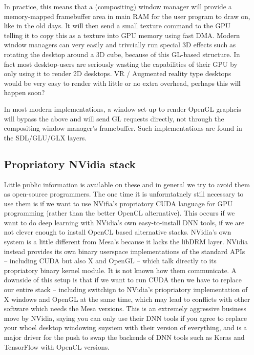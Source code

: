 \documentclass[oneside,english]{scrbook}
\begin{document}
In practice, this means that a (compositing) window manager will provide a memory-mapped framebuffer area in main RAM for the user program to draw on, like in the old days.   It will then send a small texture command to the GPU telling it to copy this as a texture into GPU memory using fast DMA.  Modern window managers can very easily and trivcially run special 3D effects such as rotating the desktop around a 3D cube, because of this GL-based structure.  In fact most desktop-users are seriously wasting the capabilities of their GPU by only using it to render 2D desktops. VR / Augmented reality type desktops would be very easy to render with little or no extra overhead, perhaps this will happen soon?

In most modern implementations, a window set up to render OpenGL graphcis will bypass the above and will send GL requests directly, not through the compositing window manager's framebuffer.  Such implementations are found in the SDL/GLU/GLX layers.

\subsection{Propriatory NVidia stack}
Little public information is available on these and in general we try to avoid them as open-source programmers.   The one time it is unformtatnely still necessary to use them is if we want to use NVifia's propriatory CUDA language for GPU programming (rather than the better OpenCL alternative).  This occurs if we want to do deep learning with NVidia's own easy-to-install DNN tools, if we are not clever enough to install OpenCL based alternative stacks.   NVidia's own system is a little different from Mesa's because it lacks the libDRM layer.  NVidia instead provides its own binary userspace implementations of the standard APIs -- including CUDA but also X and OpenGL -- which talk directly to its propriatory binary kernel module.  It is not known how them communicate.   A downside of this setup is that if we want to run CUDA then we have to replace our entire stack -- including switchign to NVidia's priopriatory implementation of X windows and OpenGL at the same time, which may lead to conflicts with other software which needs the Mesa versions.  This is an extremely aggressive business move by NVidia, saying you can only use their DNN tools if you agree to replace your whoel desktop windowing suystem with their version of everything, and is a major driver for the push to swap the backends of DNN tools such as Keras and TensorFlow with OpenCL versions.  
\end{document}
